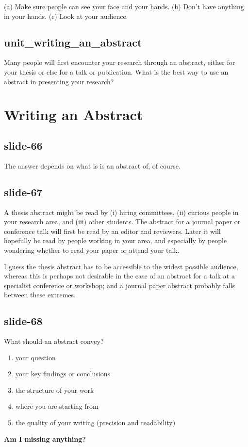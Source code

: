 \documentclass[12pt,\papersize]{extarticle}
\begin{document}
(a) Make sure people can see your face and your hands.
(b) Don't have anything in your hands.
(c) Look at your audience.
 
\subsection{unit\_writing\_an\_abstract}
Many people will first encounter your research through an abstract, either for your thesis or else for a talk or publication.  What is the best way to use an abstract in presenting your research?
 
 
 
\section{Writing an Abstract}
 
\subsection{slide-66}
The answer depends on what is is an abstract of, of course.
 
\subsection{slide-67}
A thesis abstract might be read by (i) hiring committees, (ii) curious people in your research area,
and (iii) other students.
The abstract for a journal paper or conference talk will first be read by an editor and reviewers.
Later it will hopefully be read by people working in your area, and especially by people
wondering whether to read your paper or attend your talk.
 
I guess the thesis abstract has to be accessible to the widest possible audience, whereas
this is perhaps not desirable in the case of an abstract for a talk at a specialist conference or 
workshop; and a journal paper abstract probably falls between these extremes.
 
\subsection{slide-68}
What should an abstract convey?
\begin{enumerate}
\item your question
\item your key findings or conclusions
\item the structure of your work
\item where you are starting from
\item the quality of your writing (precision and readability)
\end{enumerate}
\textbf{Am I missing anything?}
 
\end{document}
